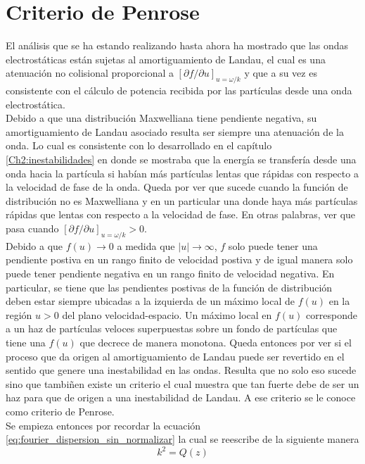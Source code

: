 \documentclass[../tesis_main_file.tex]{subfile}
\begin{document}
\section{Criterio de Penrose}
El análisis que se ha estando realizando hasta ahora ha mostrado que las ondas electrostáticas están sujetas al amortiguamiento de Landau,
el cual es una atenuación no colisional proporcional a $[\partial f / \partial u]_{u=\omega / k}$ y que a su vez es consistente con el cálculo de potencia recibida por las partículas desde una onda electrostática.\\
Debido a que una distribución Maxwelliana tiene pendiente negativa, su amortiguamiento de Landau asociado resulta ser siempre una atenuación de la onda.
Lo cual es consistente con lo desarrollado en el capítulo \ref{Ch2:inestabilidades} en donde se mostraba que la energía se transfería desde una onda hacia la partícula si habían más partículas lentas que rápidas con respecto a la velocidad de fase de la onda.
Queda por ver que sucede cuando la función de distribución no es Maxwelliana y en un particular una donde haya más partículas rápidas que lentas con respecto a la velocidad de fase.
En otras palabras, ver que pasa cuando $[\partial f / \partial u]_{u=\omega / k} > 0$.\\
Debido a que $f(u) \to 0$ a medida que $|u| \to \infty $, $f$ solo puede tener una pendiente postiva en un rango finito de velocidad postiva y de igual manera solo puede tener pendiente negativa en un rango finito de velocidad negativa.
En particular, se tiene que las pendientes postivas de la función de distribución deben estar siempre ubicadas a la izquierda de un máximo local de $f(u)$ en la región $u>0$ del plano velocidad-espacio.
Un máximo local en $f(u)$ corresponde a un haz de partículas veloces superpuestas sobre un fondo de partículas que tiene una $f(u)$ que decrece de manera monotona.
Queda entonces por ver si el proceso que da origen al amortiguamiento de Landau puede ser revertido en el sentido que genere una inestabilidad en las ondas.
Resulta que no solo eso sucede sino que tambiñen existe un criterio el cual muestra que tan fuerte debe de ser un haz para que de origen a una inestabilidad de Landau. A ese criterio se le conoce como criterio de Penrose. \cite{bellan2008fundamentals}\\
Se empieza entonces por recordar la ecuación \ref{eq:fourier_dispersion_sin_normalizar} la cual se reescribe de la siguiente manera
\begin{equation}
\label{eq:k2=Q}
k^2 =Q(z)
\end{equation}
\end{document}
